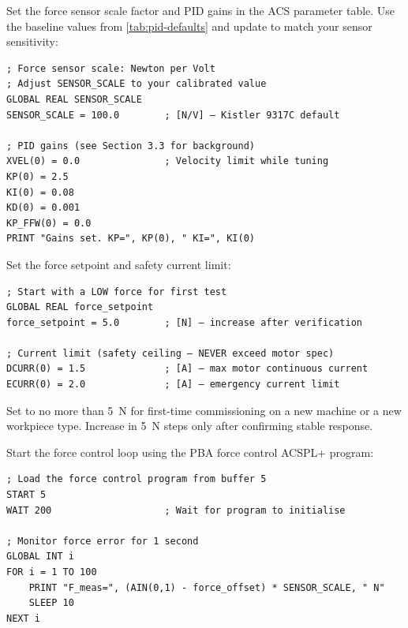 \begin{steplist}

  \step Set the force sensor scale factor and PID gains in the ACS
        parameter table.  Use the baseline values from \cref{tab:pid-defaults}
        and update  to match your sensor sensitivity:

        \begin{acscode}
\begin{lstlisting}
; Force sensor scale: Newton per Volt
; Adjust SENSOR_SCALE to your calibrated value
GLOBAL REAL SENSOR_SCALE
SENSOR_SCALE = 100.0        ; [N/V] — Kistler 9317C default

; PID gains (see Section 3.3 for background)
XVEL(0) = 0.0               ; Velocity limit while tuning
KP(0) = 2.5
KI(0) = 0.08
KD(0) = 0.001
KP_FFW(0) = 0.0
PRINT "Gains set. KP=", KP(0), " KI=", KI(0)
\end{lstlisting}
        \end{acscode}

  \step Set the force setpoint and safety current limit:

        \begin{acscode}
\begin{lstlisting}
; Start with a LOW force for first test
GLOBAL REAL force_setpoint
force_setpoint = 5.0        ; [N] — increase after verification

; Current limit (safety ceiling — NEVER exceed motor spec)
DCURR(0) = 1.5              ; [A] — max motor continuous current
ECURR(0) = 2.0              ; [A] — emergency current limit
\end{lstlisting}
        \end{acscode}

  \begin{cautionbox}
    Set  to no more than \SI{5}{\newton} for
    first-time commissioning on a new machine or a new workpiece type.
    Increase in \SI{5}{\newton} steps only after confirming stable response.
  \end{cautionbox}

  \step Start the force control loop using the PBA force control ACSPL+
        program:

        \begin{acscode}
\begin{lstlisting}
; Load the force control program from buffer 5
START 5
WAIT 200                    ; Wait for program to initialise

; Monitor force error for 1 second
GLOBAL INT i
FOR i = 1 TO 100
    PRINT "F_meas=", (AIN(0,1) - force_offset) * SENSOR_SCALE, " N"
    SLEEP 10
NEXT i
\end{lstlisting}
        \end{acscode}

\end{steplist}


